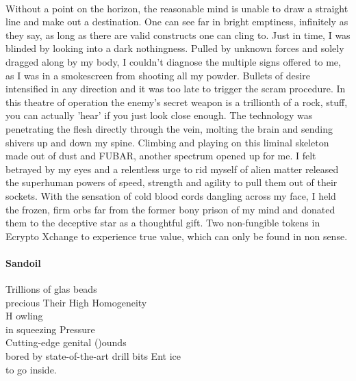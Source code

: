 \documentclass{article}
\begin{document}
\paragraph{}
Without a point on the horizon, the reasonable mind 
is unable to draw a straight line and
make out a destination.
One can see far in bright emptiness,
infinitely as they say, 
as long as there are valid constructs one can cling to. 
Just in time, I was blinded by looking into a dark nothingness.
Pulled by unknown forces and solely dragged along by my body,
I couldn't diagnose the multiple signs offered to me, 
as I was in a smokescreen from shooting all my powder.  
Bullets of desire intensified in any direction and it was 
too late to trigger the scram procedure. 
In this theatre of operation
the enemy's secret weapon is a trillionth of a rock, 
stuff, you can actually 'hear' if you just look close enough. 
The technology was penetrating the flesh directly through the vein, 
molting the brain and sending shivers up and down my spine. 
Climbing and playing on this liminal skeleton 
made out of dust and 
FUBAR, another spectrum opened up for me.
I felt betrayed by my eyes and a relentless urge to rid myself of alien matter
released the superhuman powers of speed, strength and agility 
to pull them out of their sockets.
With the sensation of cold blood cords dangling across my face, I 
held the frozen, firm orbs far from the former bony prison of my mind and 
donated them to the deceptive star as a thoughtful gift. 
Two non-fungible tokens in Ecrypto Xchange 
to experience true value, which can only be found in non sense.

\paragraph{Sandoil}
Trillions of glas beads \\
precious Their High Homogeneity \\
H owling \\ 
in squeezing Pressure \\
Cutting-edge genital ()ounds \\
bored by state-of-the-art drill bits 
Ent ice \\
to go inside. \\
\end{document}
